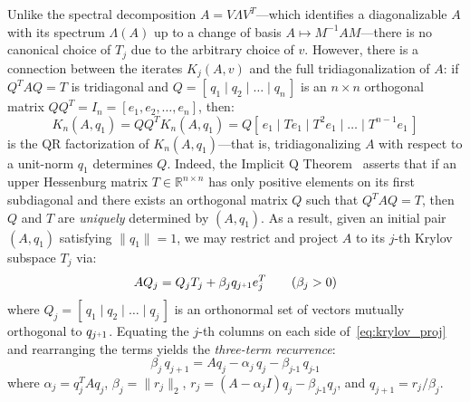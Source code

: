 \documentclass[10pt]{article}
\numberwithin{equation}{section}
\newcommand{\+}{%
	\raisebox{0.18ex}{\scaleobj{0.55}{+}}
}
\theoremstyle{definition}
\theoremstyle{definition}
\begin{document}
Unlike the spectral decomposition $A = V \Lambda V^T$---which identifies a diagonalizable $A$ with its spectrum $\Lambda(A)$ up to a change of basis $A \mapsto M^{-1} A M$---there is no canonical choice of $T_j$ due to the arbitrary choice of $v$. 
However, there is a connection between the iterates $K_j(A,v)$ and the full tridiagonalization of $A$: if $Q^T A Q = T$ is tridiagonal and $Q= [\, q_1 \mid q_2 \mid \dots \mid q_n \,]$ is an $n \times n$ orthogonal matrix $Q Q^T = I_n = [e_1, e_2, \dots, e_n]$, then:
\begin{equation}
	K_n(A, q_1) = Q Q^T K_n(A, q_1) = Q[ \, e_1 \mid T e_1 \mid T^2 e_1 \mid \dots \mid T^{n-1} e_1 \, ]
\end{equation}
is the QR factorization of $K_n(A, q_1)$---that is, tridiagonalizing $A$ with respect to a unit-norm $q_1$ determines $Q$. 
Indeed, the Implicit Q Theorem~\cite{golub2013matrix} asserts that if an upper Hessenburg matrix $T \in \mathbb{R}^{n \times n}$ has only positive elements on its first subdiagonal and there exists an orthogonal matrix $Q$ such that $Q^T A Q = T$, then $Q$ and $T$ are \emph{uniquely} determined by $(A, q_1)$. 
As a result, given an initial pair $(A, q_1)$ satisfying $\lVert q_1 \rVert = 1$, we may restrict and project $A$ to its $j$-th Krylov subspace $T_j$ via: 
\begin{equation}\label{eq:krylov_proj}
	A Q_j = Q_j T_j + \beta_j q_{j\+1} e_{j}^T \quad\quad (\beta_j > 0)
\end{equation}
where $Q_j = [\, q_1 \mid q_2 \mid \dots \mid q_j \,]$ is an orthonormal set of vectors mutually orthogonal to $q_{j\+1}$.
Equating the $j$-th columns on each side of~\eqref{eq:krylov_proj} and rearranging the terms yields the \emph{three-term recurrence}: 
\begin{equation}\label{eq:three_term_rec}
	 \beta_{j} \, q_{j+1} = A q_j - \alpha_j \, q_j - \beta_{j\text{-}1} \, q_{j\text{-}1}  
\end{equation}
where $\alpha_j = q_j^T A q_j$, $\beta_j = \lVert r_j \rVert_2$, $r_j = (A - \alpha_j I)q_j - \beta_{j\text{-}1} q_j$, and $q_{j+1} = r_j / \beta_j$. 
\end{document}

